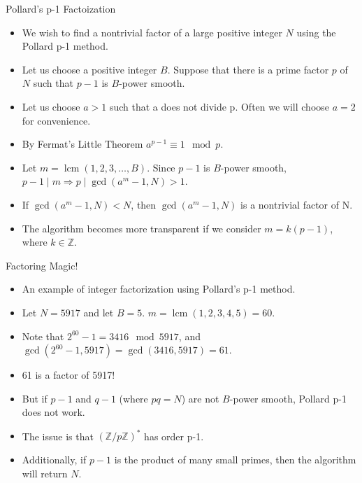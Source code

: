 \documentclass{beamer}
\DeclareMathOperator{\lcm}{lcm}
\begin{document}
	\begin{frame}{Pollard's p-1 Factoization}
		\begin{itemize}
			\item We wish to find a nontrivial factor of a large positive integer $N$ using the Pollard p-1 method.
			\item Let us choose a positive integer $B$. Suppose that there is a prime factor $p$ of $N$ such that $p-1$ is $B$-power smooth.
			\item Let us choose $a > 1$ such that a does not divide p. Often we will choose $a=2$ for convenience.
			\item By Fermat's Little Theorem $a^{p-1} \equiv 1 \mod p$.
			\item Let $m = \lcm (1,2,3,\dotso,B)$. Since $p-1$ is $B$-power smooth, $p-1 \mid m \Longrightarrow p \mid \gcd (a^m-1,N) > 1$.
			\item If $\gcd (a^m-1,N) < N$, then $\gcd (a^m-1,N)$ is a nontrivial factor of N.
			\item The algorithm becomes more transparent if we consider $m=k(p-1)$, where $k\in\mathbb{Z}$.
		\end{itemize}
	\end{frame}
	
	\begin{frame}{Factoring Magic!}
		\begin{itemize}
			\item An example of integer factorization using Pollard's p-1 method.
			\item Let $N=5917$ and let $B=5$. $m=\lcm (1,2,3,4,5)=60$.
			\item Note that $2^{60}-1=3416 \mod 5917$, and $\gcd (2^{60}-1, 5917)=\gcd (3416, 5917)=61$.
			\item 61 is a factor of 5917!
			\item But if $p-1$ and $q-1$ (where $pq=N$) are not $B$-power smooth, Pollard p-1 does not work.
			\item The issue is that $(\mathbb{Z}/p\mathbb{Z})^*$ has order p-1.
			\item Additionally, if $p-1$ is the product of many small primes, then the algorithm will return $N$.
		\end{itemize}
	\end{frame}
	
\end{document}
